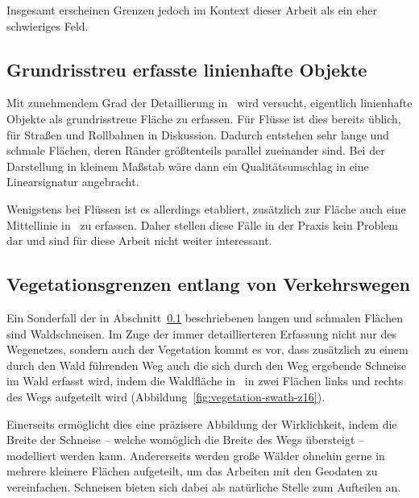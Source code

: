 \documentclass[../main/thesis.tex]{subfiles}
\begin{document}
Insgesamt erscheinen Grenzen jedoch im Kontext dieser Arbeit als ein eher schwieriges Feld.



\subsection{Grundrisstreu erfasste linienhafte Objekte}
\label{ground-plan-linear-objects-case-desc}

Mit zunehmendem Grad der Detaillierung in \osm\ wird versucht, eigentlich linienhafte Objekte als grundrisstreue Fläche zu erfassen.
Für Flüsse ist dies bereits üblich,  für Straßen und Rollbahnen in Diskussion.
Dadurch entstehen sehr lange und schmale Flächen, deren Ränder größtenteils parallel zueinander sind.
Bei der Darstellung in kleinem Maßstab wäre dann ein Qualitätsumschlag in eine Linearsignatur angebracht.

Wenigstens bei Flüssen ist es allerdings etabliert, zusätzlich zur Fläche auch eine Mittellinie in \osm\ zu erfassen.
Daher stellen diese Fälle in der Praxis kein Problem dar und sind für diese Arbeit nicht weiter interessant.



\subsection{Vegetationsgrenzen entlang von Verkehrswegen}
\label{vegetation-case-desc}

Ein Sonderfall der in Abschnitt~\ref{ground-plan-linear-objects-case-desc} beschriebenen langen und schmalen Flächen sind Waldschneisen.
Im Zuge der immer detaillierteren Erfassung nicht nur des Wegenetzes, sondern auch der Vegetation kommt es vor, dass zusätzlich zu einem durch den Wald führenden Weg auch die sich durch den Weg ergebende Schneise im Wald erfasst wird, indem die Waldfläche in \osm\ in zwei Flächen links und rechts des Wegs aufgeteilt wird (Abbildung~\ref{fig:vegetation-swath-z16}).

Einerseits ermöglicht dies eine präzisere Abbildung der Wirklichkeit, indem die Breite der Schneise -- welche womöglich die Breite des Wegs übersteigt -- modelliert werden kann.
Andererseits werden große Wälder ohnehin gerne in mehrere kleinere Flächen aufgeteilt, um das Arbeiten mit den Geodaten zu vereinfachen.
Schneisen bieten sich dabei als natürliche Stelle zum Aufteilen an.
\end{document}
